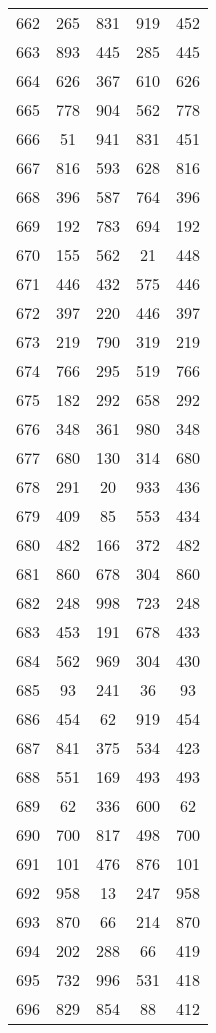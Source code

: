 \documentclass[a4paper,10pt,ngerman]{scrartcl}
\begin{document}
\begin{longtable}[c]{c|c|c|c|c}
    662 & 265 & 831 & 919 & 452 \\
    663 & 893 & 445 & 285 & 445 \\
    664 & 626 & 367 & 610 & 626 \\
    665 & 778 & 904 & 562 & 778 \\
    666 & 51 & 941 & 831 & 451 \\
    667 & 816 & 593 & 628 & 816 \\
    668 & 396 & 587 & 764 & 396 \\
    669 & 192 & 783 & 694 & 192 \\
    670 & 155 & 562 & 21 & 448 \\
    671 & 446 & 432 & 575 & 446 \\
    672 & 397 & 220 & 446 & 397 \\
    673 & 219 & 790 & 319 & 219 \\
    674 & 766 & 295 & 519 & 766 \\
    675 & 182 & 292 & 658 & 292 \\
    676 & 348 & 361 & 980 & 348 \\
    677 & 680 & 130 & 314 & 680 \\
    678 & 291 & 20 & 933 & 436 \\
    679 & 409 & 85 & 553 & 434 \\
    680 & 482 & 166 & 372 & 482 \\
    681 & 860 & 678 & 304 & 860 \\
    682 & 248 & 998 & 723 & 248 \\
    683 & 453 & 191 & 678 & 433 \\
    684 & 562 & 969 & 304 & 430 \\
    685 & 93 & 241 & 36 & 93 \\
    686 & 454 & 62 & 919 & 454 \\
    687 & 841 & 375 & 534 & 423 \\
    688 & 551 & 169 & 493 & 493 \\
    689 & 62 & 336 & 600 & 62 \\
    690 & 700 & 817 & 498 & 700 \\
    691 & 101 & 476 & 876 & 101 \\
    692 & 958 & 13 & 247 & 958 \\
    693 & 870 & 66 & 214 & 870 \\
    694 & 202 & 288 & 66 & 419 \\
    695 & 732 & 996 & 531 & 418 \\
    696 & 829 & 854 & 88 & 412 \\

\end{longtable}
\end{document}
